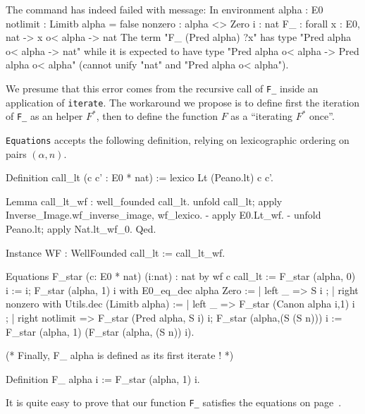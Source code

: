 \begin{Coqanswer}
The command has indeed failed with message:
In environment
alpha : E0
notlimit : Limitb alpha = false
nonzero : alpha <> Zero
i : nat
F_ : forall x : E0, nat -> x o< alpha -> nat
The term "F_ (Pred alpha) ?x" has type "Pred alpha o< alpha -> nat"
while it is expected to have type 
"Pred alpha o< alpha -> Pred alpha o< alpha"
(cannot unify "nat" and "Pred alpha o< alpha").
\end{Coqanswer}


We presume that this error comes from the recursive call of \texttt{F\_} inside
an application of \texttt{iterate}. The workaround we propose is to define first 
the iteration of \texttt{F\_}  as an helper $F^*$, then to define the function $F$ as a ``iterating $F^*$ once''.

\texttt{Equations} accepts the following definition, relying on  lexicographic ordering on pairs $(\alpha,n)$.


\label{sect:F-equations}

\label{Functions:F-alpha}
  
\begin{Coqsrc}
Definition call_lt (c c' : E0 * nat) :=
  lexico Lt (Peano.lt) c c'.

Lemma call_lt_wf : well_founded call_lt.
  unfold call_lt; apply Inverse_Image.wf_inverse_image,  wf_lexico.
  -  apply E0.Lt_wf.
  -  unfold Peano.lt; apply Nat.lt_wf_0. 
Qed.

Instance WF : WellFounded call_lt := call_lt_wf.

Equations  F_star (c: E0 * nat) (i:nat) :  nat by wf  c call_lt :=
    F_star (alpha, 0) i := i;
    F_star (alpha, 1) i
      with E0_eq_dec alpha Zero :=
           { | left _ => S i ;
             | right nonzero
                 with Utils.dec (Limitb alpha) :=
                 { | left _ => F_star (Canon alpha i,1) i ;
                   | right notlimit =>
                     F_star (Pred alpha, S i)  i}};
    F_star (alpha,(S (S n))) i :=
               F_star (alpha, 1) (F_star (alpha, (S n)) i).

(* Finally, F_ alpha is defined as its first iterate ! *)

Definition F_  alpha i := F_star (alpha, 1) i.
\end{Coqsrc}

It is quite easy to prove that our function \texttt{F\_} satisfies the equations on page~\pageref{sect:F-equations}.

